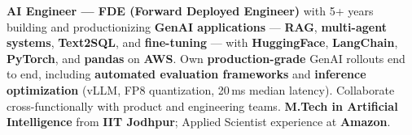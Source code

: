 \documentclass[letter,10pt]{article}
\begin{document}

\textbf{AI Engineer --- FDE (Forward Deployed Engineer)} with 5+ years building and productionizing \textbf{GenAI applications} --- \textbf{RAG}, \textbf{multi-agent systems}, \textbf{Text2SQL}, and \textbf{fine-tuning} --- with \textbf{HuggingFace}, \textbf{LangChain}, \textbf{PyTorch}, and \textbf{pandas} on \textbf{AWS}.
Own \textbf{production-grade} GenAI rollouts end to end, including \textbf{automated evaluation frameworks} and \textbf{inference optimization} (vLLM, FP8 quantization, 20\,ms median latency).
Collaborate cross-functionally with product and engineering teams. \textbf{M.Tech in Artificial Intelligence} from \textbf{IIT Jodhpur}; Applied Scientist experience at \textbf{Amazon}.
\end{document}
